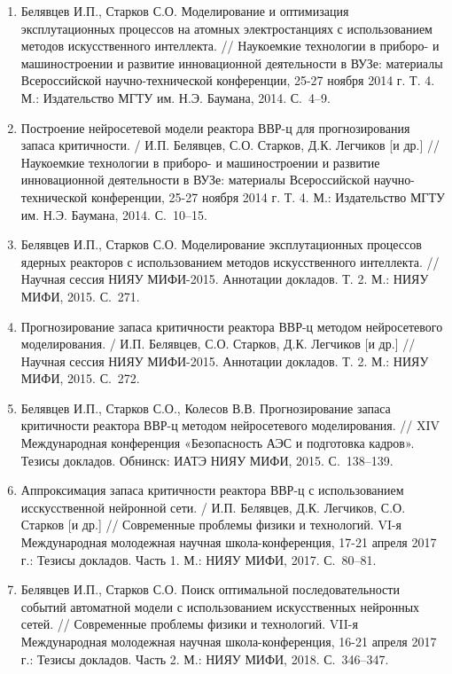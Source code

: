 \documentclass[a4paper,12pt]{extreport}
\begin{document}
\begin{enumerate}[resume]
    \item Белявцев И.П., Старков С.О. Моделирование и оптимизация эксплутационных процессов на атомных электростанциях с использованием методов искусственного интеллекта. // Наукоемкие технологии в приборо- и машиностроении и развитие инновационной деятельности в ВУЗе: материалы Всероссийской научно-технической конференции, 25-27 ноября 2014 г. Т. 4. М.: Издательство МГТУ им. Н.Э. Баумана, 2014. С.~4–9.
    \item Построение нейросетевой модели реактора ВВР-ц для прогнозирования запаса критичности. / И.П. Белявцев, С.О. Старков, Д.К. Легчиков [и др.] // Наукоемкие технологии в приборо- и машиностроении и развитие инновационной деятельности в ВУЗе: материалы Всероссийской научно-технической конференции, 25-27 ноября 2014 г. Т. 4. М.: Издательство МГТУ им. Н.Э. Баумана, 2014. С.~10–15.
    \item Белявцев И.П., Старков С.О. Моделирование эксплутационных процессов ядерных реакторов с использованием методов искусственного интеллекта. // Научная сессия НИЯУ МИФИ-2015. Аннотации докладов. Т. 2. М.: НИЯУ МИФИ, 2015. С.~271.
    \item Прогнозирование запаса критичности реактора ВВР-ц методом нейросетевого моделирования. / И.П. Белявцев, С.О. Старков, Д.К. Легчиков [и др.] // Научная сессия НИЯУ МИФИ-2015. Аннотации докладов. Т. 2. М.: НИЯУ МИФИ, 2015. С.~272.
    \item Белявцев И.П., Старков С.О., Колесов В.В. Прогнозирование запаса критичности реактора ВВР-ц методом нейросетевого моделирования. // XIV Международная конференция «Безопасность АЭС и подготовка кадров». Тезисы докладов. Обнинск: ИАТЭ НИЯУ МИФИ, 2015. С.~138–139.
    \item Аппроксимация запаса критичности реактора ВВР-ц с использованием исскусственной нейронной сети. / И.П. Белявцев, Д.К. Легчиков, С.О. Старков [и др.] // Современные проблемы физики и технологий. VI-я Международная молодежная научная школа-конференция, 17-21 апреля 2017 г.: Тезисы докладов. Часть 1. М.: НИЯУ МИФИ, 2017. С.~80–81.
    \item Белявцев И.П., Старков С.О. Поиск оптимальной последовательности событий автоматной модели с использованием искусственных нейронных сетей. // Современные проблемы физики и технологий. VII-я Международная молодежная научная школа-конференция, 16-21 апреля 2017 г.: Тезисы докладов. Часть 2.  М.: НИЯУ МИФИ, 2018. С.~346–347.
\end{enumerate}
\end{document}
